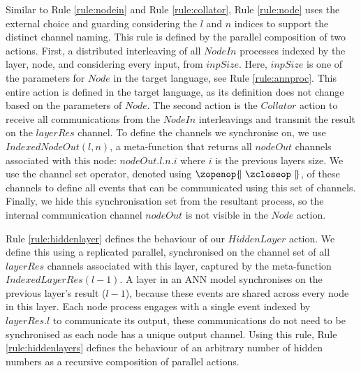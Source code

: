 Similar to Rule \ref{rule:nodein} and Rule \ref{rule:collator}, Rule \ref{rule:node} uses the external choice and guarding considering the $l$ and $n$ indices to support the distinct channel naming. This rule is defined by the parallel composition of two actions. First, a distributed interleaving of all $NodeIn$ processes indexed by the layer, node, and considering every input, from $inpSize$. Here, $inpSize$ is one of the parameters for $Node$ in the target language, see Rule \ref{rule:annproc}. This entire action is defined in the target language, as its definition does not change based on the parameters of $Node$. The second action is the $Collator$ action to receive all communications from the $NodeIn$ interleavings and transmit the result on the $layerRes$ channel. To define the channels we synchronise on, we use $IndexedNodeOut(l,n)$, a meta-function that returns all $nodeOut$ channels associated with this node: $nodeOut.l.n.i$ where $i$ is the previous layers size. We use the channel set operator, denoted using $\lchanset \rchanset$, of these channels to define all events that can be communicated using this set of channels. Finally, we hide this synchronisation set from the resultant process, so the internal communication channel $nodeOut$ is not visible in the $Node$ action. 

Rule \ref{rule:hiddenlayer} defines the behaviour of our $HiddenLayer$ action. We define this using a replicated parallel, synchronised on the channel set of all $layerRes$ channels associated with this layer, captured by the meta-function $IndexedLayerRes(l-1)$. A layer in an ANN model synchronises on the previous layer's result ($l-1$), because these events are shared across every node in this layer. Each node process engages with a single event indexed by $layerRes.l$ to communicate its output, these communications do not need to be synchronised as each node has a unique output channel. Using this rule, Rule \ref{rule:hiddenlayers} defines the behaviour of an arbitrary number of hidden numbers as a recursive composition of parallel actions. 

